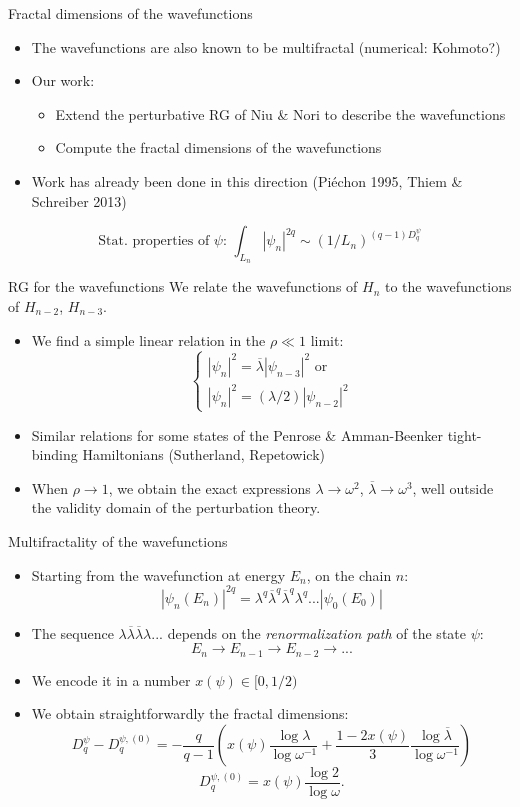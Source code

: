 \documentclass[xcolor=x11names,compress,professionalfonts]{beamer}
\renewcommand{\(}{\begin{columns}}
\renewcommand{\)}{\end{columns}}
\newcommand{\<}[1]{\begin{column}{#1}}
\renewcommand{\>}{\end{column}}
\newcommand{\lb}{\ensuremath{\overline{\lambda}}}
\begin{document}
\begin{frame}{Fractal dimensions of the wavefunctions}
\begin{itemize}
	\item The wavefunctions are also known to be multifractal (numerical: Kohmoto?)
	\item Our work:
	\begin{itemize}
		\item Extend the perturbative RG of Niu \& Nori to describe the wavefunctions
		\item Compute the fractal dimensions of the wavefunctions
	\end{itemize}
	\item Work has already been done in this direction (Piéchon 1995, Thiem \& Schreiber 2013)
\end{itemize}
	\[
	\text{Stat. properties of $\psi$:~} 
	\int_{L_n} |\psi_n|^{2q} \sim (1/L_n)^{(q-1)D_q^\psi} 
	\]
\end{frame}

\begin{frame}{RG for the wavefunctions}
We relate the wavefunctions of $H_n$ to the wavefunctions of $H_{n-2}$, $H_{n-3}$.
\begin{itemize}
	\item We find a simple linear relation in the $\rho \ll 1$ limit: 
	\[
	\begin{cases}
		|\psi_n|^2 = \lb |\psi_{n-3}|^2 \text{~or}\\
		|\psi_n|^2 = (\lambda/2) |\psi_{n-2}|^2
	\end{cases}
	\]
	\item Similar relations for some states of the Penrose \& Amman-Beenker tight-binding Hamiltonians (Sutherland, Repetowick)
	\item When $\rho \rightarrow 1$, we obtain the exact expressions $\lambda \rightarrow \omega^2$, $\lb \rightarrow \omega^3$, well outside the validity domain of the perturbation theory.
\end{itemize}
\end{frame}

\begin{frame}{Multifractality of the wavefunctions}
\begin{itemize}
	\item Starting from the wavefunction at energy $E_n$, on the chain $n$:
		\[ |\psi_n(E_n)|^{2q} = \lambda^q \lb^q \lb^q \lambda^q ... |\psi_0(E_0)| \]
	\item The sequence $\lambda \lb \lb \lambda ...$ depends on the \emph{renormalization path} of the state $\psi$:
	\[ E_n \rightarrow E_{n-1} \rightarrow E_{n-2} \rightarrow ... \]
	\item We encode it in a number $x(\psi) \in [0,1/2)$
	\item We obtain straightforwardly the fractal dimensions:
	\[ D_q^\psi - D_q^{\psi,(0)} = - \frac{q}{q-1} \left( x(\psi) \frac{\log \lambda}{\log \omega^{-1}} + \frac{1-2x(\psi)}{3}\frac{\log \lb}{\log \omega^{-1}} \right) \]
	\[  D_q^{\psi,(0)} = x(\psi) \frac{\log 2}{\log \omega}. \]
\end{itemize}
\end{frame}
\end{document}

